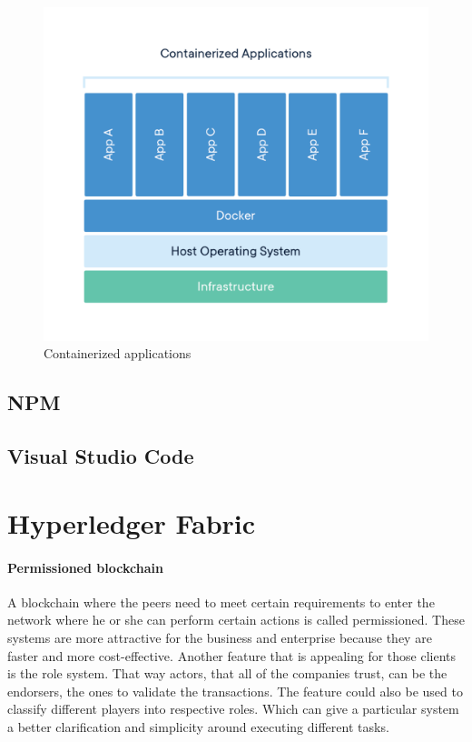\documentclass[a4paper,11pt]{report}
\begin{document}
\begin{figure}[h]
\centering
  \includegraphics[width = 16cm]{container-what-is-container.png}
  \caption{ Containerized applications \cite{dockerContainer}}
  \label{dockerEnvironment}
\end{figure}

\section{NPM}

\section{Visual Studio Code}
\label{vsCode}
\chapter{Hyperledger Fabric}
\label{hplFabric}

\subsubsection{Permissioned blockchain}
A blockchain where the peers need to meet certain requirements to enter the network where he or she can perform certain actions is called permissioned. These systems are more attractive for the business and enterprise because they are faster and more cost-effective. Another feature that is appealing for those clients is the role system. That way actors, that all of the companies trust, can be the endorsers, the ones to validate the transactions. The feature could also be used to classify different players into respective roles. Which can give a particular system a better clarification and simplicity around executing different tasks. 
\end{document}
